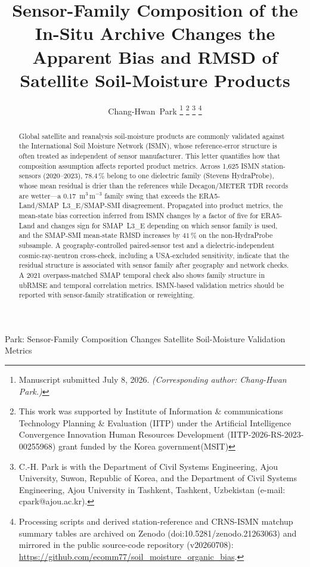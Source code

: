 \documentclass[journal]{IEEEtran}
\begin{document}
\title{Sensor-Family Composition of the In-Situ Archive Changes the
Apparent Bias and RMSD of Satellite Soil-Moisture Products}

\author{Chang-Hwan~Park%
\thanks{Manuscript submitted July 8, 2026. \emph{(Corresponding author:
Chang-Hwan Park.)}}%
\thanks{This work was supported by Institute of Information \&
communications Technology Planning \& Evaluation (IITP) under the
Artificial Intelligence Convergence Innovation Human Resources
Development (\mbox{IITP-2026-RS-2023-00255968}) grant funded by the Korea
government(MSIT)}%
\thanks{C.-H. Park is with the Department of Civil Systems Engineering,
Ajou University, Suwon, Republic of Korea, and the Department of Civil
Systems Engineering, Ajou University in Tashkent, Tashkent, Uzbekistan
(e-mail: cpark@ajou.ac.kr).}%
\thanks{Processing scripts and derived station-reference and CRNS-ISMN
matchup summary tables are archived on Zenodo
(doi:10.5281/zenodo.21263063) and mirrored in the public source-code
repository (v20260708):
\url{https://github.com/ecomm77/soil_moisture_organic_bias}.}}

%
{Park: Sensor-Family Composition
Changes Satellite Soil-Moisture Validation Metrics}

\maketitle

\begin{abstract}
Global satellite and reanalysis soil-moisture products are commonly
validated against the International Soil Moisture Network (ISMN), whose
reference-error structure is often treated as independent of sensor
manufacturer. This letter quantifies how that composition assumption
affects reported product metrics. Across 1{,}625 ISMN station-sensors
(2020–2023), $78.4\,\%$ belong to one dielectric family (Stevens
HydraProbe), whose mean residual is drier than the references while
Decagon/METER TDR records are wetter—a $0.17$~m$^3$\,m$^{-3}$ family
swing that exceeds the ERA5-Land/SMAP~L3\_E/SMAP-SMI disagreement.
Propagated into product metrics, the mean-state bias correction inferred
from ISMN changes by a factor of five for ERA5-Land and changes sign for
SMAP~L3\_E depending on which sensor family is used, and the SMAP-SMI
mean-state RMSD increases by $41\,\%$ on the non-HydraProbe subsample. A
geography-controlled paired-sensor test and a dielectric-independent
cosmic-ray-neutron cross-check, including a USA-excluded sensitivity,
indicate that the residual structure is associated with sensor family
after geography and network checks. A 2021 overpass-matched SMAP
temporal check also shows family structure in ubRMSE and temporal
correlation metrics.
ISMN-based validation metrics should be reported with sensor-family
stratification or reweighting.
\end{abstract}
\end{document}
